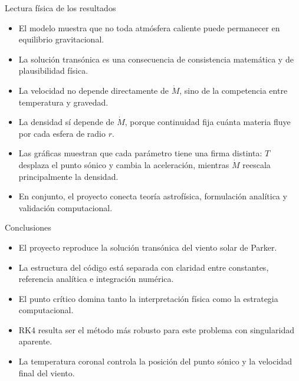 \documentclass[aspectratio=169]{beamer}
\begin{document}
\begin{frame}{Lectura f\'isica de los resultados}
  \begin{itemize}
    \item El modelo muestra que no toda atm\'osfera caliente puede permanecer en equilibrio gravitacional.
    \item La soluci\'on trans\'onica es una consecuencia de consistencia matem\'atica y de plausibilidad f\'isica.
    \item La velocidad no depende directamente de $\dot{M}$, sino de la competencia entre temperatura y gravedad.
    \item La densidad s\'i depende de $\dot{M}$, porque continuidad fija cu\'anta materia fluye por cada esfera de radio $r$.
    \item Las gr\'aficas muestran que cada par\'ametro tiene una firma distinta: $T$ desplaza el punto s\'onico y cambia la aceleraci\'on, mientras $\dot{M}$ reescala principalmente la densidad.
    \item En conjunto, el proyecto conecta teor\'ia astrof\'isica, formulaci\'on anal\'itica y validaci\'on computacional.
  \end{itemize}
\end{frame}

\begin{frame}{Conclusiones}
  \begin{itemize}
    \item El proyecto reproduce la soluci\'on trans\'onica del viento solar de Parker.
    \item La estructura del c\'odigo est\'a separada con claridad entre constantes, referencia anal\'itica e integraci\'on num\'erica.
    \item El punto cr\'itico domina tanto la interpretaci\'on f\'isica como la estrategia computacional.
    \item RK4 resulta ser el m\'etodo m\'as robusto para este problema con singularidad aparente.
    \item La temperatura coronal controla la posici\'on del punto s\'onico y la velocidad final del viento.
  \end{itemize}
\end{frame}
\end{document}
